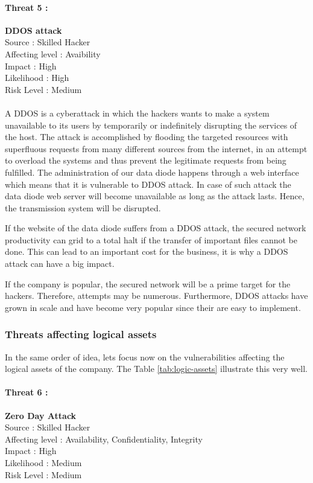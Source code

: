 \documentclass[a4paper,10pt]{article}
\begin{document}
\paragraph{Threat 5 :}  \textbf{DDOS attack} \\ 
Source : Skilled Hacker \\ 
Affecting level : Avaibility  \\
Impact : High \\
Likelihood : High \\
Risk Level : Medium
\paragraph{}A DDOS is a cyberattack in which the hackers wants to make a system unavailable to its users by temporarily or indefinitely disrupting the services of the host. The attack is accomplished by flooding the targeted resources with superfluous requests from many different sources from the internet, in an attempt to overload the systems and thus prevent the legitimate requests from being fulfilled. The administration of our data diode happens through a web interface which means that it is vulnerable to DDOS attack. In case of such attack the data diode web server will become unavailable as long as the attack lasts. Hence, the transmission system will be disrupted.

If the website of the data diode suffers from a DDOS attack, the secured network productivity can grid to a total halt if the transfer of important files cannot be done. This can lead to an important cost for the business, it is why a DDOS attack can have a big impact.

If the company is popular, the secured network will be a prime target for the hackers. Therefore, attempts may be numerous. Furthermore, DDOS attacks have grown in scale and have become very popular since their are easy to implement.\\


\subsubsection{Threats affecting logical assets}
In the same order of idea, lets focus now on the vulnerabilities affecting the logical assets of the company. The Table \ref{tab:logic-assets} illustrate this very well.

\paragraph{Threat 6 :}  \textbf{Zero Day Attack} \\ 
Source : Skilled Hacker \\ 
Affecting level : Availability, Confidentiality, Integrity  \\
Impact : High \\
Likelihood : Medium \\
Risk Level : Medium
\end{document}
